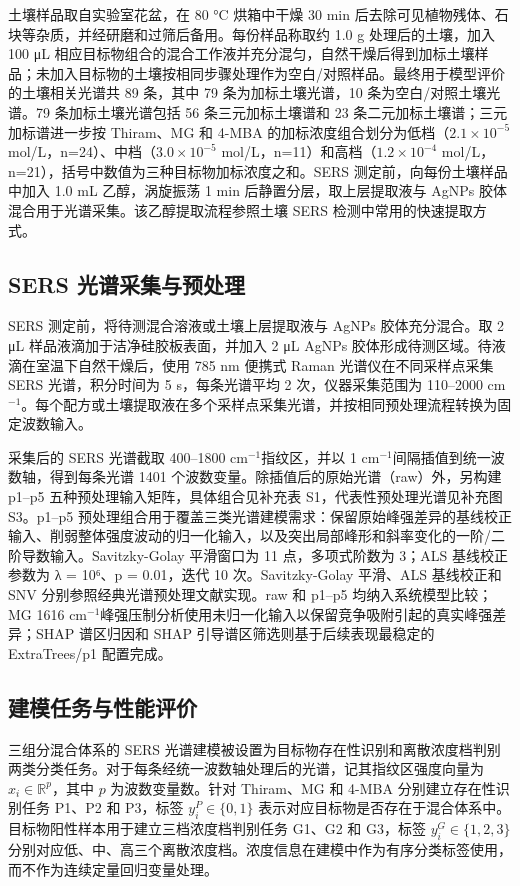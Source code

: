 \documentclass[preprint,12pt]{elsarticle}
\newcommand{\cmone}{cm$^{-1}$}
\begin{document}
土壤样品取自实验室花盆，在 80 °C 烘箱中干燥 30 min 后去除可见植物残体、石块等杂质，并经研磨和过筛后备用。每份样品称取约 1.0 g 处理后的土壤，加入 100 μL 相应目标物组合的混合工作液并充分混匀，自然干燥后得到加标土壤样品；未加入目标物的土壤按相同步骤处理作为空白/对照样品。最终用于模型评价的土壤相关光谱共 89 条，其中 79 条为加标土壤光谱，10 条为空白/对照土壤光谱。79 条加标土壤光谱包括 56 条三元加标土壤谱和 23 条二元加标土壤谱；三元加标谱进一步按 Thiram、MG 和 4-MBA 的加标浓度组合划分为低档（\(2.1\times10^{-5}\) mol/L，n=24）、中档（\(3.0\times10^{-5}\) mol/L，n=11）和高档（\(1.2\times10^{-4}\) mol/L，n=21），括号中数值为三种目标物加标浓度之和。SERS 测定前，向每份土壤样品中加入 1.0 mL 乙醇，涡旋振荡 1 min 后静置分层，取上层提取液与 AgNPs 胶体混合用于光谱采集。该乙醇提取流程参照土壤 SERS 检测中常用的快速提取方式\cite{ref6}。

\subsection{SERS 光谱采集与预处理}

SERS 测定前，将待测混合溶液或土壤上层提取液与 AgNPs 胶体充分混合。取 2 μL 样品液滴加于洁净硅胶板表面，并加入 2 μL AgNPs 胶体形成待测区域。待液滴在室温下自然干燥后，使用 785 nm 便携式 Raman 光谱仪在不同采样点采集 SERS 光谱，积分时间为 5 s，每条光谱平均 2 次，仪器采集范围为 110–2000 \cmone。每个配方或土壤提取液在多个采样点采集光谱，并按相同预处理流程转换为固定波数输入。

采集后的 SERS 光谱截取 400–1800 \cmone 指纹区，并以 1 \cmone 间隔插值到统一波数轴，得到每条光谱 1401 个波数变量。除插值后的原始光谱（raw）外，另构建 p1–p5 五种预处理输入矩阵，具体组合见补充表 S1，代表性预处理光谱见补充图 S3。p1–p5 预处理组合用于覆盖三类光谱建模需求：保留原始峰强差异的基线校正输入、削弱整体强度波动的归一化输入，以及突出局部峰形和斜率变化的一阶/二阶导数输入。Savitzky-Golay 平滑窗口为 11 点，多项式阶数为 3；ALS 基线校正参数为 λ = 10⁶、p = 0.01，迭代 10 次。Savitzky-Golay 平滑、ALS 基线校正和 SNV 分别参照经典光谱预处理文献实现\cite{ref12,ref13,ref14}。raw 和 p1–p5 均纳入系统模型比较；MG 1616 \cmone 峰强压制分析使用未归一化输入以保留竞争吸附引起的真实峰强差异；SHAP 谱区归因和 SHAP 引导谱区筛选则基于后续表现最稳定的 ExtraTrees/p1 配置完成。

\subsection{建模任务与性能评价}

三组分混合体系的 SERS 光谱建模被设置为目标物存在性识别和离散浓度档判别两类分类任务。对于每条经统一波数轴处理后的光谱，记其指纹区强度向量为 \(x_i \in \mathbb{R}^{p}\)，其中 \(p\) 为波数变量数。针对 Thiram、MG 和 4-MBA 分别建立存在性识别任务 P1、P2 和 P3，标签 \(y_i^{P}\in\{0,1\}\) 表示对应目标物是否存在于混合体系中。目标物阳性样本用于建立三档浓度档判别任务 G1、G2 和 G3，标签 \(y_i^{G}\in\{1,2,3\}\) 分别对应低、中、高三个离散浓度档。浓度信息在建模中作为有序分类标签使用，而不作为连续定量回归变量处理。
\end{document}
